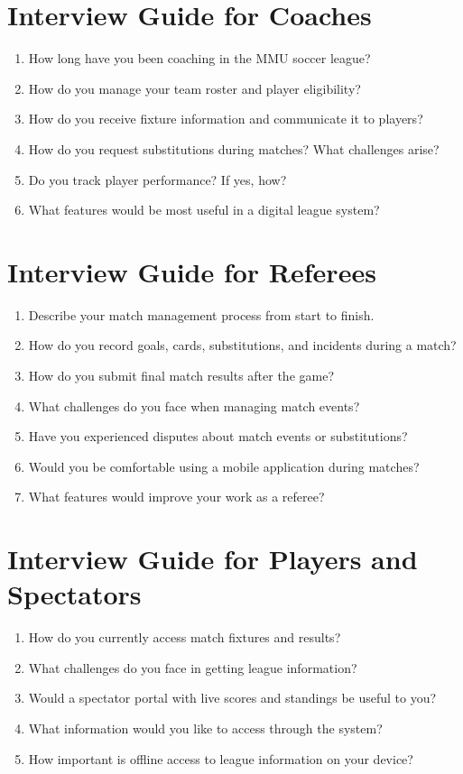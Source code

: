 \documentclass[12pt,a4paper]{report}
\begin{document}
\section*{Interview Guide for Coaches}
\begin{enumerate}
  \item How long have you been coaching in the MMU soccer league?
  \item How do you manage your team roster and player eligibility?
  \item How do you receive fixture information and communicate it to players?
  \item How do you request substitutions during matches? What challenges arise?
  \item Do you track player performance? If yes, how?
  \item What features would be most useful in a digital league system?
\end{enumerate}

\section*{Interview Guide for Referees}
\begin{enumerate}
  \item Describe your match management process from start to finish.
  \item How do you record goals, cards, substitutions, and incidents during a match?
  \item How do you submit final match results after the game?
  \item What challenges do you face when managing match events?
  \item Have you experienced disputes about match events or substitutions?
  \item Would you be comfortable using a mobile application during matches?
  \item What features would improve your work as a referee?
\end{enumerate}

\section*{Interview Guide for Players and Spectators}
\begin{enumerate}
  \item How do you currently access match fixtures and results?
  \item What challenges do you face in getting league information?
  \item Would a spectator portal with live scores and standings be useful to you?
  \item What information would you like to access through the system?
  \item How important is offline access to league information on your device?
\end{enumerate}
\end{document}
